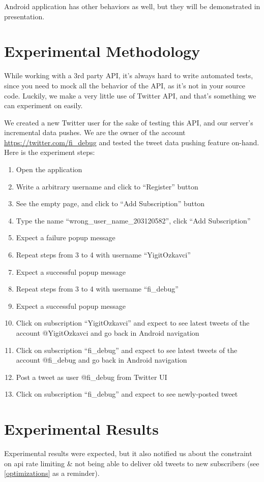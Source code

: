 \documentclass{article}
\begin{document}
\par Android application has other behaviors as well, but they will be demonstrated in presentation.

\section{Experimental Methodology}
While working with a 3rd party API, it's always hard to write automated tests, since you need to mock all the behavior of the API, as it's not in your source code. Luckily, we make a very little use of Twitter API, and that's something we can experiment on easily.

\par We created a new Twitter user for the sake of testing this API, and our server's incremental data pushes. We are the owner of the account \url{https://twitter.com/fi\_debug} and tested the tweet data pushing feature on-hand. Here is the experiment steps:

\begin{enumerate}
  \item Open the application
  \item Write a arbitrary username and click to ``Register'' button
  \item See the empty page, and click to ``Add Subscription'' button
  \item Type the name ``wrong\_user\_name\_203120582'', click ``Add Subscription''
  \item Expect a failure popup message
  \item Repeat steps from 3 to 4 with username ``YigitOzkavci''
  \item Expect a successful popup message
  \item Repeat steps from 3 to 4 with username ``fi\_debug''
  \item Expect a successful popup message
  \item Click on subscription ``YigitOzkavci'' and expect to see latest tweets of the account @YigitOzkavci and go back in Android navigation
  \item Click on subscription ``fi\_debug'' and expect to see latest tweets of the account @fi\_debug and go back in Android navigation
  \item Post a tweet as user @fi\_debug from Twitter UI
  \item Click on subscription ``fi\_debug'' and expect to see newly-posted tweet
\end{enumerate}
\section{Experimental Results}
Experimental results were expected, but it also notified us about the constraint on api rate limiting \& not being able to deliver old tweets to new subscribers (see \ref{optimizations} as a reminder).
\end{document}
